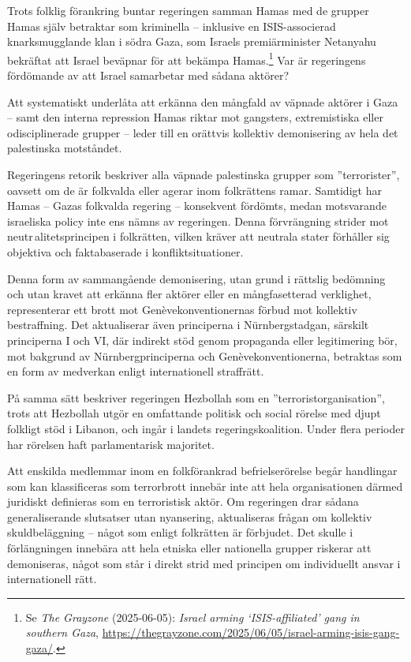 Trots folklig förankring buntar regeringen samman Hamas med de grupper Hamas själv betraktar som kriminella – inklusive en ISIS-associerad 
knarksmugglande klan i södra Gaza, som Israels premiärminister Netanyahu 
bekräftat att Israel beväpnar för att bekämpa Hamas.\footnote{Se \textit{The Grayzone} (2025-06-05): \textit{Israel arming ‘ISIS-affiliated’ gang in southern Gaza}, \url{https://thegrayzone.com/2025/06/05/israel-arming-isis-gang-gaza/}.} Var är regeringens fördömande av att Israel samarbetar med sådana aktörer?

Att systematiskt underlåta att erkänna den mångfald av väpnade aktörer i Gaza – samt den 
interna repression Hamas riktar mot gangsters, extremistiska eller odisciplinerade grupper – leder till en orättvis 
kollektiv demonisering av hela det palestinska motståndet. 

Regeringens retorik beskriver alla väpnade palestinska grupper som ”terrorister”, oavsett om de är folkvalda eller 
agerar inom folkrättens ramar. Samtidigt har Hamas – Gazas folkvalda regering – konsekvent fördömts, medan motsvarande israeliska policy inte ens nämns av regeringen.
Denna förvrängning strider mot neutr alitetsprincipen i folkrätten, vilken kräver att neutrala stater förhåller sig 
objektiva och faktabaserade i konfliktsituationer.

Denna form av sammangående demonisering, utan grund i rättslig bedömning och utan kravet att erkänna fler 
aktörer eller en mångfasetterad verklighet, representerar ett brott mot Genèvekonventionernas förbud mot kollektiv 
bestraffning. Det aktualiserar även principerna i Nürnbergstadgan, särskilt principerna I och VI, där indirekt stöd 
genom propaganda eller legitimering bör, mot bakgrund av Nürnbergprinciperna och Genèvekonventionerna, 
betraktas som en form av medverkan enligt internationell straffrätt.

På samma sätt beskriver regeringen Hezbollah som en ”terroristorganisation”, trots att Hezbollah utgör en omfattande 
politisk och social rörelse med djupt folkligt stöd i Libanon, och ingår i landets regeringskoalition. 
Under flera perioder har rörelsen haft parlamentarisk majoritet.

Att enskilda medlemmar inom en folkförankrad befrielserörelse begår handlingar som kan klassificeras som 
terrorbrott innebär inte att hela organisationen därmed juridiskt definieras som en terroristisk aktör. 
Om regeringen drar sådana generaliserande slutsatser utan nyansering, aktualiseras frågan om kollektiv skuldbeläggning – något 
som enligt folkrätten är förbjudet. Det skulle i förlängningen innebära att hela etniska eller nationella grupper 
riskerar att demoniseras, något som står i direkt strid med principen om individuellt ansvar i internationell rätt.

